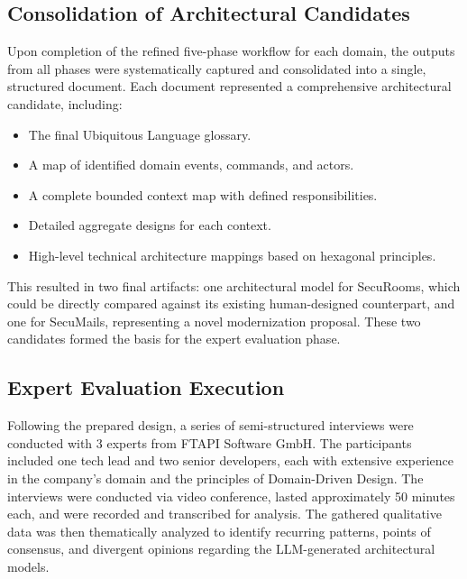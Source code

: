 \subsection{Consolidation of Architectural Candidates}
Upon completion of the refined five-phase workflow for each domain, the outputs from all phases were systematically captured and consolidated into a single, structured document. Each document represented a comprehensive architectural candidate, including:
\begin{itemize}
    \item The final Ubiquitous Language glossary.
    \item A map of identified domain events, commands, and actors.
    \item A complete bounded context map with defined responsibilities.
    \item Detailed aggregate designs for each context.
    \item High-level technical architecture mappings based on hexagonal principles.
\end{itemize}
This resulted in two final artifacts: one architectural model for SecuRooms, which could be directly compared against its existing human-designed counterpart, and one for SecuMails, representing a novel modernization proposal. These two candidates formed the basis for the expert evaluation phase.

\subsection{Expert Evaluation Execution}
Following the prepared design, a series of semi-structured interviews were conducted with 3 experts from FTAPI Software GmbH. The participants included one tech lead and two senior developers, each with extensive experience in the company's domain and the principles of Domain-Driven Design. The interviews were conducted via video conference, lasted approximately 50 minutes each, and were recorded and transcribed for analysis. The gathered qualitative data was then thematically analyzed to identify recurring patterns, points of consensus, and divergent opinions regarding the LLM-generated architectural models.